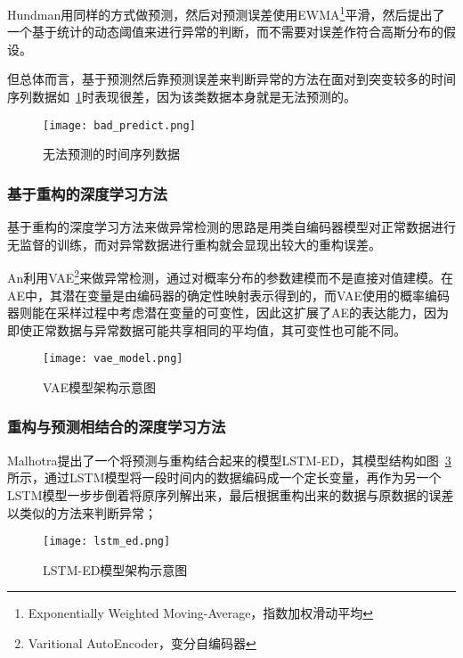 Hundman\cite{DBLP:conf/kdd/HundmanCLCS18}用同样的方式做预测，然后对预测误差使用EWMA\footnote{Exponentially Weighted Moving-Average，指数加权滑动平均}平滑，然后提出了一个基于统计的动态阈值来进行异常的判断，而不需要对误差作符合高斯分布的假设。

但总体而言，基于预测然后靠预测误差来判断异常的方法在面对到突变较多的时间序列数据如~\ref{fig:bad:predict}时表现很差，因为该类数据本身就是无法预测的。

\begin{figure}[htbp]
    \centering
    \texttt{[image: bad\_predict.png]}
    \caption{无法预测的时间序列数据\cite{malhotra2016lstm}}
    \label{fig:bad:predict}
  \end{figure}

\subsubsection{基于重构的深度学习方法}

基于重构的深度学习方法来做异常检测的思路是用类自编码器模型对正常数据进行无监督的训练，而对异常数据进行重构就会显现出较大的重构误差。

An\cite{an2015variational}利用VAE\footnote{Varitional AutoEncoder，变分自编码器}来做异常检测，通过对概率分布的参数建模而不是直接对值建模。在AE中，其潜在变量是由编码器的确定性映射表示得到的，而VAE使用的概率编码器则能在采样过程中考虑潜在变量的可变性，因此这扩展了AE的表达能力，因为即使正常数据与异常数据可能共享相同的平均值，其可变性也可能不同。

\begin{figure}[htbp]
    \centering
    \texttt{[image: vae\_model.png]}
    \caption{VAE模型架构示意图\cite{an2015variational}}
    \label{fig:vae:moddel}
  \end{figure}

\subsubsection{重构与预测相结合的深度学习方法}
Malhotra\cite{malhotra2016lstm}提出了一个将预测与重构结合起来的模型LSTM-ED，其模型结构如图~\ref{fig:lstm:ed}所示，通过LSTM模型将一段时间内的数据编码成一个定长变量，再作为另一个LSTM模型一步步倒着将原序列解出来，最后根据重构出来的数据与原数据的误差以\cite{malhotra2015long}类似的方法来判断异常；

\begin{figure}[htbp]
    \centering
    \texttt{[image: lstm\_ed.png]}
    \caption{LSTM-ED模型架构示意图\cite{malhotra2016lstm}}
    \label{fig:lstm:ed}
  \end{figure}


